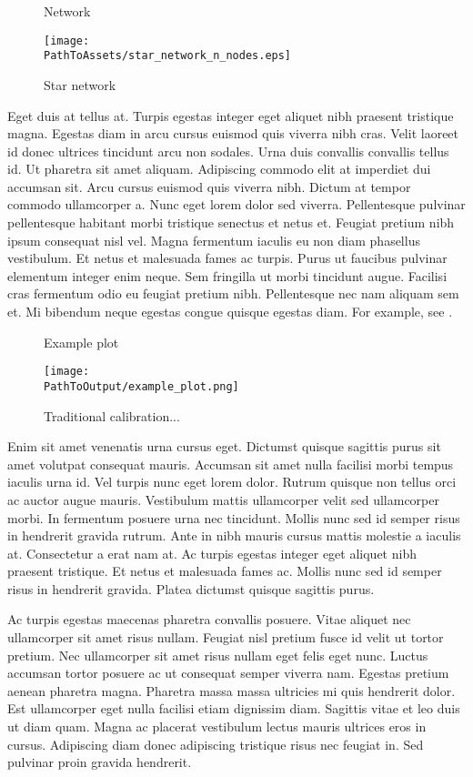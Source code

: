 \begin{figure}
\centering
\captionsetup{width=0.8\textwidth}
\caption{Network}
  \centering
  \texttt{[image: \\PathToAssets/star\_network\_n\_nodes.eps]}
\caption*{
  Star network
  }
\label{fig:star_network_n_nodes.eps}
\end{figure}


Eget duis at tellus at. Turpis egestas integer eget aliquet nibh praesent
tristique magna. Egestas diam in arcu cursus euismod quis viverra nibh cras.
Velit laoreet id donec ultrices tincidunt arcu non sodales. Urna duis
convallis convallis tellus id. Ut pharetra sit amet aliquam. Adipiscing
commodo elit at imperdiet dui accumsan sit. Arcu cursus euismod quis viverra
nibh. Dictum at tempor commodo ullamcorper a. Nunc eget lorem dolor sed
viverra. Pellentesque pulvinar pellentesque habitant morbi tristique senectus
et netus et. Feugiat pretium nibh ipsum consequat nisl vel. Magna fermentum
iaculis eu non diam phasellus vestibulum. Et netus et malesuada fames ac
turpis. Purus ut faucibus pulvinar elementum integer enim neque. Sem
fringilla ut morbi tincidunt augue. Facilisi cras fermentum odio eu feugiat
pretium nibh. Pellentesque nec nam aliquam sem et. Mi bibendum neque egestas
congue quisque egestas diam. For example, see \citet{Alvarez2005}.

\begin{figure}
\centering
\caption{Example plot}
  \centering
  \texttt{[image: \\PathToOutput/example\_plot.png]}
\caption*{
  Traditional calibration...
  }
\label{fig:div-futures-habits-comparison}
\end{figure}

Enim sit amet venenatis urna cursus eget. Dictumst quisque sagittis purus sit
amet volutpat consequat mauris. Accumsan sit amet nulla facilisi morbi tempus
iaculis urna id. Vel turpis nunc eget lorem dolor. Rutrum quisque non tellus
orci ac auctor augue mauris. Vestibulum mattis ullamcorper velit sed
ullamcorper morbi. In fermentum posuere urna nec tincidunt. Mollis nunc sed
id semper risus in hendrerit gravida rutrum. Ante in nibh mauris cursus
mattis molestie a iaculis at. Consectetur a erat nam at. Ac turpis egestas
integer eget aliquet nibh praesent tristique. Et netus et malesuada fames ac.
Mollis nunc sed id semper risus in hendrerit gravida. Platea dictumst quisque
sagittis purus.

Ac turpis egestas maecenas pharetra convallis posuere. Vitae aliquet nec
ullamcorper sit amet risus nullam. Feugiat nisl pretium fusce id velit ut
tortor pretium. Nec ullamcorper sit amet risus nullam eget felis eget nunc.
Luctus accumsan tortor posuere ac ut consequat semper viverra nam. Egestas
pretium aenean pharetra magna. Pharetra massa massa ultricies mi quis
hendrerit dolor. Est ullamcorper eget nulla facilisi etiam dignissim diam.
Sagittis vitae et leo duis ut diam quam. Magna ac placerat vestibulum lectus
mauris ultrices eros in cursus. Adipiscing diam donec adipiscing tristique
risus nec feugiat in. Sed pulvinar proin gravida hendrerit.

